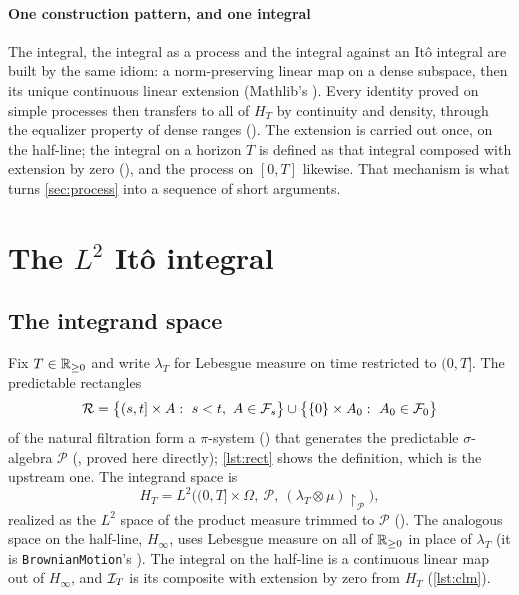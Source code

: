 \documentclass[11pt]{article}
\newcommand{\HT}{H_T}
\begin{document}
\paragraph{One construction pattern, and one integral}
The integral, the integral as a process and the integral against an It\^o integral are built by the same
idiom: a norm-preserving linear map on a dense subspace, then its unique continuous linear extension
(Mathlib's ). Every identity proved on simple processes then transfers to
all of $\HT$ by continuity and density, through the equalizer property of dense ranges
(). The extension is carried out once, on the half-line; the integral on a horizon $T$ is
defined as that integral composed with extension by zero (), and the process on $[0,T]$ likewise.
That mechanism is what turns \cref{sec:process} into a sequence of short arguments.

\section{The \texorpdfstring{$L^2$}{L2} It\^o integral}\label{sec:integral}

\subsection{The integrand space}
Fix $T\in\mathbb{R}_{\ge0}$ and write $\lambda_T$ for Lebesgue measure on time restricted to $(0,T]$. The
predictable rectangles
\[
  \mathcal R=\bigl\{(s,t]\times A:\ s<t,\ A\in\mathcal{F}_s\bigr\}\cup\bigl\{\{0\}\times A_0:\ A_0\in\mathcal{F}_0\bigr\}
\]
of the natural filtration form a $\pi$-system () that generates the
predictable $\sigma$-algebra $\mathcal P$ (, proved here directly);
\cref{lst:rect} shows the definition, which is the upstream one. The integrand space is
\[
  \HT=L^2\bigl((0,T]\times\Omega,\ \mathcal P,\ (\lambda_T\otimes\mu)\restriction_{\mathcal P}\bigr),
\]
realized as the $L^2$ space of the product measure trimmed to $\mathcal P$ (). The analogous space
on the half-line, $H_\infty$, uses Lebesgue measure on all of $\mathbb{R}_{\ge0}$ in place of $\lambda_T$ (it is
\texttt{BrownianMotion}'s ). The integral on the half-line is a continuous linear map out of
$H_\infty$, and $\mathcal{I}_T$ is its composite with extension by zero from $\HT$ (\cref{lst:clm}).
\end{document}

